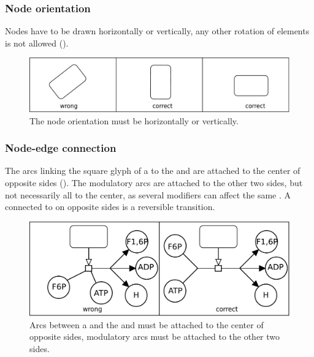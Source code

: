 \subsubsection{Node orientation}

Nodes have to be drawn horizontally or vertically, any other
rotation of elements is not allowed ().

\begin{figure}[h!]
  \centering
  \includegraphics[scale=0.3]{images/layout-orientation}
  \caption{The node orientation must be horizontally or
  vertically.}\label{fig:layout5}
\end{figure}

\subsubsection{Node-edge connection}

The arcs linking the square glyph of a  to the  and 
 are attached to the center of opposite sides (). The modulatory
arcs are attached to the other two sides, but not necessarily
all to the center, as several modifiers can affect the same . A  connected to  on opposite
sides is a reversible transition.

\begin{figure}[h!]
  \centering
  \includegraphics[scale=0.3]{images/layout-connecting-arcs}
  \caption{Arcs between a   and the  and  must be attached to the center of opposite sides, modulatory
  arcs must be attached to the other two sides.}\label{fig:layout6}
\end{figure}

